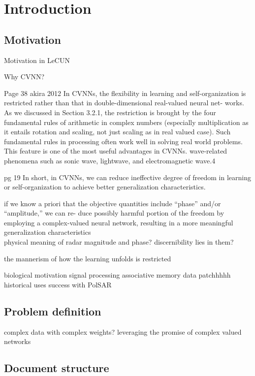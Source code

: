 \chapter{Introduction} \label{chap:intro}

\section{Motivation} \label{sect:thefirst}
Motivation in LeCUN

Why CVNN?

Page 38 akira 2012
 In CVNNs, the flexibility in learning and self-organization
is restricted rather than that in double-dimensional real-valued neural net-
works. As we discussed in Section 3.2.1, the restriction is brought by the four
fundamental rules of arithmetic in complex numbers (especially multiplication as it entails rotation and scaling, not just scaling as in real valued case). Such fundamental rules
in processing often work well in solving real world problems. This feature is
one of the most useful advantages in CVNNs. wave-related phenomena
such as sonic wave, lightwave, and electromagnetic wave.4

pg 19
In short, in CVNNs, we can reduce ineffective degree of freedom in
learning or self-organization to achieve better generalization characteristics.

 if we know a priori
that the objective quantities include “phase” and/or “amplitude,” we can re-
duce possibly harmful portion of the freedom by employing a complex-valued
neural network, resulting in a more meaningful generalization characteristics\\

physical meaning of radar magnitude and phase? discernibility lies in them?

the mannerism of how the learning unfolds is restricted


biological motivation
signal processing
associative memory
data patchhhhh
historical uses
success with PolSAR




\section{Problem definition} \label{sect:thefirst}
complex data with complex weights?
leveraging the promise of complex valued networks

\section{Document structure} \label{sect:thefirst}

